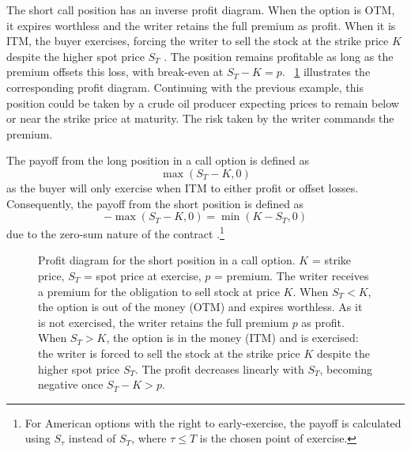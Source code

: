 \documentclass[english,12pt,a4paper,pdftex,sci,utf8]{aaltothesis}
\begin{document}
The short call position has an inverse profit diagram. When the option is OTM, it expires worthless and the writer retains the full premium as profit. When it is ITM, the buyer exercises, forcing the writer to sell the stock at the strike price $K$ despite the higher spot price $S_T$ \cite{hull2018}. The position remains profitable as long as the premium offsets this loss, with break-even at $S_T - K = p$. ~\cref{fig:short_call_payoff} illustrates the corresponding profit diagram. Continuing with the previous example, this position could be taken by a crude oil producer expecting prices to remain below or near the strike price at maturity. The risk taken by the writer commands the premium.

The payoff from the long position in a call option is defined as
\begin{equation}
    \max(S_T-K,0)
\label{eq:long_call_payoff}
\end{equation}
as the buyer will only exercise when ITM to either profit or offset losses. Consequently, the payoff from the short position is defined as 
\begin{equation*}
    -\max(S_T-K,0) = \min(K-S_T,0)
\end{equation*}
due to the zero-sum nature of the contract \cite{hull2018}.\footnote{For American options with the right to early-exercise, the payoff is calculated using $S_\tau$ instead of $S_T$, where $\tau \le T$ is the chosen point of exercise.}

\begin{center}
\begin{figure}[H]
\centering
    \caption{Profit diagram for the short position in a call option. $K$ = strike price, $S_T$ = spot price at exercise, $p$ = premium. The writer receives a premium for the obligation to sell stock at price $K$. When $S_T < K$, the option is out of the money (OTM) and expires worthless. As it is not exercised, the writer retains the full premium $p$ as profit. When $S_T > K$, the option is in the money (ITM) and is exercised: the writer is forced to sell the stock at the strike price $K$ despite the higher spot price $S_T$. The profit decreases linearly with $S_T$, becoming negative once $S_T - K > p$.}
    \label{fig:short_call_payoff}
\end{figure}
\end{center}
\end{document}
